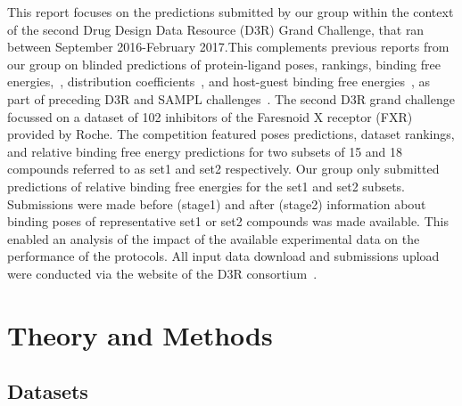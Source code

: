 \documentclass{svjour3}                     %
\begin{document}
This report focuses on the predictions submitted by our group within the context of the second Drug Design Data Resource (D3R) Grand Challenge, that ran between September 2016-February 2017.This complements previous reports from our group on blinded predictions of protein-ligand poses, rankings, binding free energies,~\cite{MeyJuarez-JimenezHennessyEtAl2016}, distribution coefficients~\cite{BosisioMeyMichel2016}, and host-guest binding free energies~\cite{BosisioMeyMichel2017}, as part of preceding D3R and SAMPL challenges~\cite{GathiakaLiuChiuEtAl2016,ShirtsKleinSwailsEtAl2017}. 
The second D3R grand challenge focussed on a dataset of 102 inhibitors of the Faresnoid X receptor (FXR) provided by Roche. The competition featured poses predictions, dataset rankings, and relative binding free energy predictions for two subsets of 15 and 18 compounds referred to as set1 and set2 respectively. Our group only submitted predictions of relative binding free energies for the set1 and set2 subsets.  Submissions were made before (stage1) and after (stage2) information about binding poses of representative set1 or set2 compounds was made available. This enabled an analysis of the impact of the available experimental data on the performance of the protocols. All input data download and submissions upload were conducted via the website of the D3R consortium~\cite{D3R2016}.


\section{Theory and Methods}

\subsection{Datasets}
\end{document}
